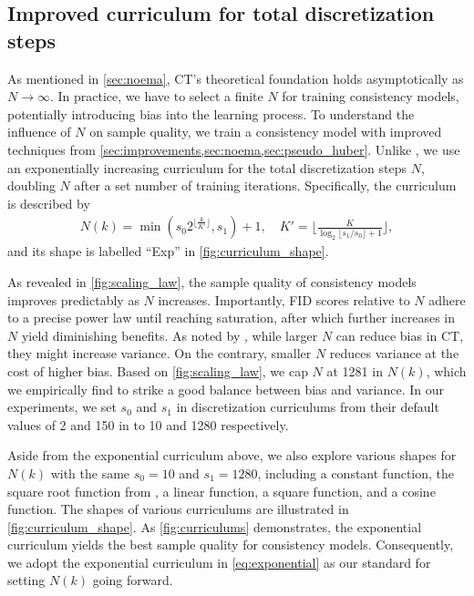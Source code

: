 \subsection{Improved curriculum for total discretization steps}\label{sec:discretization}


As mentioned in \cref{sec:noema}, CT's theoretical foundation holds asymptotically as $N \to \infty$. In practice, we have to select a finite $N$ for training consistency models, potentially introducing bias into the learning process. To understand the influence of $N$ on sample quality, we train a consistency model with improved techniques from \cref{sec:improvements,sec:noema,sec:pseudo_huber}. Unlike \citet{song2023consistency}, we use an exponentially increasing curriculum for the total discretization steps $N$, doubling $N$ after a set number of training iterations. Specifically, the curriculum is described by
\begin{align}
N(k) = \min( s_0 2^{\lfloor \frac{k}{K'} \rfloor}, s_1) + 1, \quad K' = \Big\lfloor \frac{K}{\log_2 \lfloor s_1 / s_0 \rfloor + 1} \Big\rfloor,
\label{eq:exponential}
\end{align}
and its shape is labelled ``Exp'' in \cref{fig:curriculum_shape}.

As revealed in \cref{fig:scaling_law}, the sample quality of consistency models improves predictably as $N$ increases. Importantly, FID scores relative to $N$ adhere to a precise power law until reaching saturation, after which further increases in $N$ yield diminishing benefits. As noted by \citet{song2023consistency}, while larger $N$ can reduce bias in CT, they might increase variance. On the contrary, smaller $N$ reduces variance at the cost of higher bias. Based on \cref{fig:scaling_law}, we cap $N$ at 1281 in $N(k)$, which we empirically find to strike a good balance between bias and variance. In our experiments, we set $s_0$ and $s_1$ in discretization curriculums from their default values of 2 and 150 in \citet{song2023consistency} to 10 and 1280 respectively.



Aside from the exponential curriculum above, we also explore various shapes for $N(k)$ with the same $s_0=10$ and $s_1=1280$, including a constant function, the square root function from \citet{song2023consistency}, a linear function, a square function, and a cosine function. The shapes of various curriculums are illustrated in \cref{fig:curriculum_shape}. As \cref{fig:curriculums} demonstrates, the exponential curriculum yields the best sample quality for consistency models. Consequently, we adopt the exponential curriculum in \cref{eq:exponential} as our standard for setting $N(k)$ going forward.

